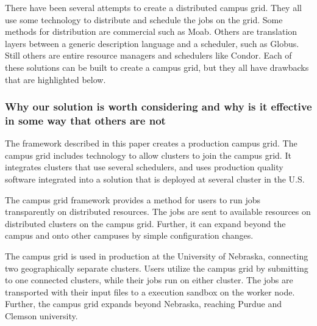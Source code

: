 \documentclass[11pt]{article}
\begin{document}

There have been several attempts to create a distributed campus grid.  They all use some technology to distribute and schedule the jobs on the grid.  Some methods for distribution are commercial such as Moab.  Others are translation layers between a generic description language and a scheduler, such as Globus.  Still others are entire resource managers and schedulers like Condor.  Each of these solutions can be built to create a campus grid, but they all have drawbacks that are highlighted below.











\subsubsection* {Why our solution is worth considering and why is it effective
in some way that others are not}

The framework described in this paper creates a production campus grid.  The campus grid includes technology to allow clusters to join the campus grid.  It integrates clusters that use several schedulers, and uses production quality software integrated into a solution that is deployed at several cluster in the U.S.

The campus grid framework provides a method for users to run jobs transparently on distributed resources.  The jobs are sent to available resources on distributed clusters on the campus grid.  Further, it can expand beyond the campus and onto other campuses by simple configuration changes.

The campus grid is used in production at the University of Nebraska, connecting two geographically separate clusters.  Users utilize the campus grid by submitting to one connected clusters, while their jobs run on either cluster.  The jobs are transported with their input files to a execution sandbox on the worker node.  Further, the campus grid expands beyond Nebraska, reaching Purdue and Clemson university.
\end{document}
